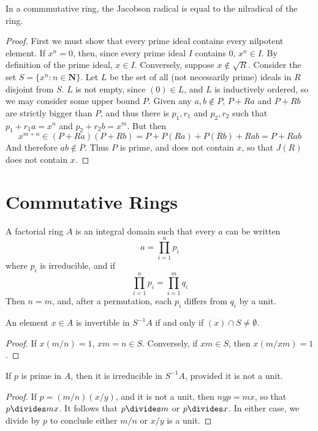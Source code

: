 \begin{theorem}
    In a commmutative ring, the Jacobson radical is equal to the nilradical of the ring.
\end{theorem}
\begin{proof}
    First we must show that every prime ideal contains every nilpotent element. If $x^n = 0$, then, since every prime ideal $I$ contains $0$, $x^n \in I$. By definition of the prime ideal, $x \in I$. Conversely, suppose $x \not\in \sqrt{R}$. Consider the set $S = \{ x^n : n \in \mathbf{N} \}$. Let $L$ be the set of all (not necessarily prime) ideals in $R$ disjoint from $S$. $L$ is not empty, since $(0) \in L$, and $L$ is inductively ordered, so we may consider some upper bound $P$. Given any $a,b \not\in P$, $P + Ra$ and $P + Rb$ are strictly bigger than $P$, and thus there is $p_1,r_1$ and $p_2,r_2$ such that $p_1 + r_1a = x^n$ and $p_2 + r_2b = x^m$. But then
    \[ x^{m + n} \in (P + Ra)(P + Rb) = P + P(Ra) + P(Rb) + Rab = P + Rab \]
    And therefore $ab \notin P$. Thus $P$ is prime, and does not contain $x$, so that $J(R)$ does not contain $x$.
\end{proof}



\chapter{Commutative Rings}

\begin{definition}
    A factorial ring $A$ is an integral domain such that every $a$ can be written
    \[ a = \prod_{i = 1}^n p_i \]
    where $p_i$ is irreducible, and if
    \[ \prod_{i = 1}^n p_i = \prod_{i = 1}^m q_i \]
    Then $n = m$, and, after a permutation, each $p_i$ differs from $q_i$ by a unit.
\end{definition}

\begin{lemma}
    An element $x \in A$ is invertible in $S^{-1}A$ if and only if $(x) \cap S \neq \emptyset$.
\end{lemma}
\begin{proof}
    If $x (m/n) = 1$, $xm = n \in S$. Conversely, if $xm \in S$, then $x (m/xm) = 1$.
\end{proof}

\begin{lemma}
    If $p$ is prime in $A$, then it is irreducible in $S^{-1}A$, provided it is not a unit.
\end{lemma}
\begin{proof}
    If $p = (m/n)(x/y)$, and it is not a unit, then $nyp = mx$, so that $p \divides mx$. It follows that $p \divides m$ or $p \divides x$. In either case, we divide by $p$ to conclude either $m/n$ or $x/y$ is a unit.
\end{proof}

